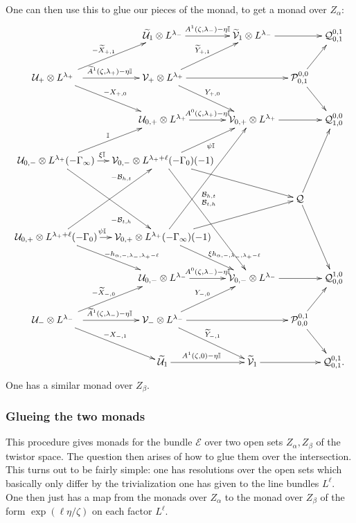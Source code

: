 \documentclass[12pt]{article}
\theoremstyle{definition}
\theoremstyle{remark}
\numberwithin{theorem}{section}
\def\bI{{\mathbb {I}}}
\def\pB{{\mathcal B}}
\def\pE{{\mathcal E}}
\def\pP{{\mathcal P}}
\def\pQ{{\mathcal Q}}
\def\pU{{\mathcal U}}
\def\pV{{\mathcal V}}
\begin{document}
One can then use this to glue our pieces of the monad, to get a monad over 
$Z_\alpha$:
  \begin{equation} \label{define-pQ2-monad}
  \xymatrix@C=0.9em{  
        &\widetilde \pU_{1}\otimes L^{\lambda_-} \ar[r]^{  A^1(\zeta,\lambda_-)-\eta\bI} &\widetilde \pV_{1}\otimes L^{\lambda_-}\ar[rr]  &&\pQ_{0,1}^{0,1} \\
\pU_{+}\otimes L^{\lambda_+}\ \ \ar[ur]^{-\widetilde X_{ +,1}  } \ar[r]^{\widetilde A^1(\zeta,\lambda_+)-\eta\bI}\ar[dr]^{-X_{+,0} }&  \pV_{+}\otimes L^{\lambda_+}\ar[ur]^{ \widetilde Y_{+,1}}\ar[dr]^{Y_{+,0}}\ar[rr] &&\pP^{0,0}_{0,1}\ar[dr] \ar[ur]\\
 & \pU_{0,+}\otimes L^{\lambda_+}\ar[r]^{ A^0(\zeta,\lambda_+)-\eta\bI}  &\pV_{0,+}\otimes L^{\lambda_+} \ar[rr]  &&\pQ^{0 ,0}_{ 1,0} \\  
\pU_{0,-}\otimes L^{\lambda_+}(-\Gamma_\infty) \ar[ur]^\bI  \ar[ddr]_(0.7){- \pB_{t,h}}\ar[r]^(0.43){\xi\bI} &  \pV_{0,-}\otimes L^{\lambda_++\ell} (-\Gamma_0 ) (-1)\ar[ur]_{\psi\bI}   \ar[drr]
\ar[rddd]^(0.4){\pB_{t,h}}  \\ 
 &&&\pQ\ar[uur]\ar[ddr] \\
 \pU_{0,+}\otimes L^{\lambda_++\ell }( -\Gamma_0) \ar[dr]^(0.6){-h_{\alpha,-,\lambda_-,\lambda_+-\ell} }  \ar[uur]^(0.7){ -  \pB_{h,t}}\ar[r]^(0.43){\psi\bI} &  \pV_{0,+}\otimes L^{\lambda_+}(-\Gamma_\infty )  (-1)\ar[dr]^(0.6){\ \ \xi h_{\alpha,-,\lambda_-,\lambda_+-\ell}} \ar[rru] \ar[ruuu]_(0.4){\pB_{h,t}}  \\
  & \pU_{0,-}\otimes L^{\lambda_-}\ar[r]^{A^0(\zeta,\lambda_-)-\eta\bI}  &\pV_{0,-}\otimes L^{\lambda_-} \ar[rr]  &&\pQ_{0 ,0}^{ 1,0} \\
\pU_{-}\otimes L^{\lambda_-}\ \ \ar[dr]^{-X_{ -,1}  } \ar[r]^{\widetilde A^1(\zeta,\lambda_-)-\eta\bI}\ar[ur]^{-\widetilde X_{-,0} } &  \pV_{-}\otimes L^{\lambda_-}\ar[dr]^{\widetilde Y_{-,1}}\ar[ur]^{Y_{-,0}}\ar[rr]  &&\pP_{0,0}^{0,1}\ar[dr] \ar[ur]\\
 & \widetilde \pU_{1}  \ar[r]^(0.43){A^1(\zeta,0)-\eta\bI}  &\widetilde \pV_{1} \ar[rr]  &&\pQ_{0,1}^{0,1}. 
  }
\end{equation}
 One has a similar monad over $Z_\beta$.
 
 
 
 \subsubsection{Glueing the two monads}
 
 This procedure gives monads for the bundle $\pE$ over two open sets $Z_\alpha, Z_\beta$ of the twistor space. The question then arises of how to glue them over the intersection.   This turns out to be fairly simple: one has resolutions over the open sets which basically only differ by the trivialization one has given to the line bundles $L^\ell$. One then just has a map from  the monads over $Z_\alpha$ to the monad over $Z_\beta$ of the form $\exp (\ell\eta/\zeta)$  on each factor $L^\ell$. 
 
\end{document}
